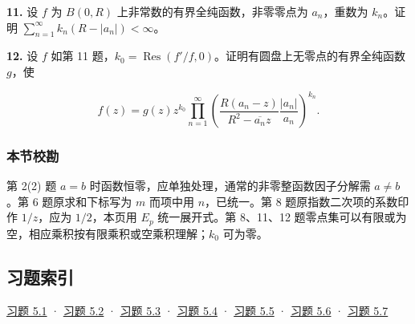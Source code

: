 \documentclass[11pt,a4paper]{article}
\begin{document}
\par{}
\noindent\textbf{11.} 设 \(f\) 为 \(B(0,R)\) 上非常数的有界全纯函数，非零零点为
\(a_n\)，重数为 \(k_n\)。证明
\(\sum_{n=1}^\infty k_n(R-|a_n|)<\infty\)。

\par{}
\noindent\textbf{12.} 设 \(f\) 如第 11
题，\(k_0=\operatorname{Res}(f'/f,0)\)。证明有圆盘上无零点的有界全纯函数
\(g\)，使

\[
f(z)=g(z)z^{k_0}\prod_{n=1}^\infty
\left(\frac{R(a_n-z)}{R^2-\overline{a_n}z}\frac{|a_n|}{a_n}\right)^{k_n}.
\]

\subsubsection{本节校勘}\label{ch05-practice-ux672cux8282ux6821ux52d8-5}

第 2(2) 题 \(a=b\) 时函数恒零，应单独处理，通常的非零整函数因子分解需
\(a\ne b\)。第 6 题原求和下标写为 \(m\) 而项中用 \(n\)，已统一。第 8
题原指数二次项的系数印作 \(1/z\)，应为 \(1/2\)，本页用 \(E_p\)
统一展开式。第 8、11、12
题零点集可以有限或为空，相应乘积按有限乘积或空乘积理解；\(k_0\) 可为零。

\subsection{习题索引}\label{ch05-practice-heading-8}

\hyperref[ch05-practice-heading-1]{习题 5.1} · \hyperref[ch05-practice-heading-2]{习题 5.2} ·
\hyperref[ch05-practice-heading-3]{习题 5.3} · \hyperref[ch05-practice-heading-4]{习题 5.4} ·
\hyperref[ch05-practice-heading-5]{习题 5.5} · \hyperref[ch05-practice-heading-6]{习题 5.6} ·
\hyperref[ch05-practice-heading-7]{习题 5.7}
\end{document}
